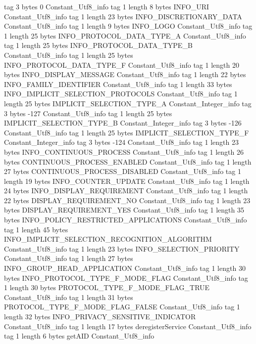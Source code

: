 {{{			tag	3
			bytes	0
		}
		Constant_Utf8_info {
			tag	1
			length	8
			bytes	INFO_URI
		}
		Constant_Utf8_info {
			tag	1
			length	23
			bytes	INFO_DISCRETIONARY_DATA
		}
		Constant_Utf8_info {
			tag	1
			length	9
			bytes	INFO_LOGO
		}
		Constant_Utf8_info {
			tag	1
			length	25
			bytes	INFO_PROTOCOL_DATA_TYPE_A
		}
		Constant_Utf8_info {
			tag	1
			length	25
			bytes	INFO_PROTOCOL_DATA_TYPE_B
		}
		Constant_Utf8_info {
			tag	1
			length	25
			bytes	INFO_PROTOCOL_DATA_TYPE_F
		}
		Constant_Utf8_info {
			tag	1
			length	20
			bytes	INFO_DISPLAY_MESSAGE
		}
		Constant_Utf8_info {
			tag	1
			length	22
			bytes	INFO_FAMILY_IDENTIFIER
		}
		Constant_Utf8_info {
			tag	1
			length	33
			bytes	INFO_IMPLICIT_SELECTION_PROTOCOLS
		}
		Constant_Utf8_info {
			tag	1
			length	25
			bytes	IMPLICIT_SELECTION_TYPE_A
		}
		Constant_Integer_info {
			tag	3
			bytes	-127
		}
		Constant_Utf8_info {
			tag	1
			length	25
			bytes	IMPLICIT_SELECTION_TYPE_B
		}
		Constant_Integer_info {
			tag	3
			bytes	-126
		}
		Constant_Utf8_info {
			tag	1
			length	25
			bytes	IMPLICIT_SELECTION_TYPE_F
		}
		Constant_Integer_info {
			tag	3
			bytes	-124
		}
		Constant_Utf8_info {
			tag	1
			length	23
			bytes	INFO_CONTINUOUS_PROCESS
		}
		Constant_Utf8_info {
			tag	1
			length	26
			bytes	CONTINUOUS_PROCESS_ENABLED
		}
		Constant_Utf8_info {
			tag	1
			length	27
			bytes	CONTINUOUS_PROCESS_DISABLED
		}
		Constant_Utf8_info {
			tag	1
			length	19
			bytes	INFO_COUNTER_UPDATE
		}
		Constant_Utf8_info {
			tag	1
			length	24
			bytes	INFO_DISPLAY_REQUIREMENT
		}
		Constant_Utf8_info {
			tag	1
			length	22
			bytes	DISPLAY_REQUIREMENT_NO
		}
		Constant_Utf8_info {
			tag	1
			length	23
			bytes	DISPLAY_REQUIREMENT_YES
		}
		Constant_Utf8_info {
			tag	1
			length	35
			bytes	INFO_POLICY_RESTRICTED_APPLICATIONS
		}
		Constant_Utf8_info {
			tag	1
			length	45
			bytes	INFO_IMPLICIT_SELECTION_RECOGNITION_ALGORITHM
		}
		Constant_Utf8_info {
			tag	1
			length	23
			bytes	INFO_SELECTION_PRIORITY
		}
		Constant_Utf8_info {
			tag	1
			length	27
			bytes	INFO_GROUP_HEAD_APPLICATION
		}
		Constant_Utf8_info {
			tag	1
			length	30
			bytes	INFO_PROTOCOL_TYPE_F_MODE_FLAG
		}
		Constant_Utf8_info {
			tag	1
			length	30
			bytes	PROTOCOL_TYPE_F_MODE_FLAG_TRUE
		}
		Constant_Utf8_info {
			tag	1
			length	31
			bytes	PROTOCOL_TYPE_F_MODE_FLAG_FALSE
		}
		Constant_Utf8_info {
			tag	1
			length	32
			bytes	INFO_PRIVACY_SENSITIVE_INDICATOR
		}
		Constant_Utf8_info {
			tag	1
			length	17
			bytes	deregisterService
		}
		Constant_Utf8_info {
			tag	1
			length	6
			bytes	getAID
		}
		Constant_Utf8_info {
}}}
